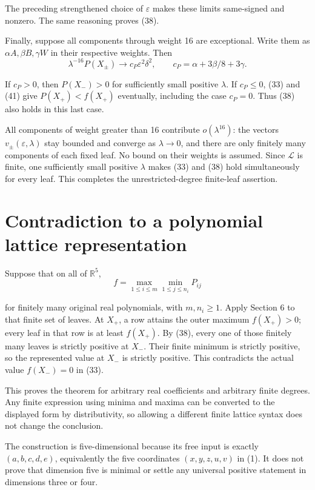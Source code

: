 \documentclass[11pt]{article}
\begin{document}
The preceding strengthened choice of \(\varepsilon\) makes these limits
same-signed and nonzero. The same reasoning proves (38).

Finally, suppose all components through weight 16 are exceptional. Write
them as \(\alpha A,\beta B,\gamma W\) in their respective weights.
Then
\[
\lambda^{-16}P(X_\pm)\longrightarrow
c_P\varepsilon^2\delta^2,
\qquad c_P=\alpha+3\beta/8+3\gamma.
\tag{41}
\]

If \(c_P>0\), then \(P(X_-)>0\) for sufficiently small positive
\(\lambda\). If \(c_P\le0\), (33) and (41) give
\(P(X_+)<f(X_+)\) eventually, including the case \(c_P=0\).
Thus (38) also holds in this last case.

All components of weight greater than 16 contribute
\(o(\lambda^{16})\): the vectors \(v_\pm(\varepsilon,\lambda)\)
stay bounded and converge as \(\lambda\to0\), and there are only
finitely many components of each fixed leaf. No bound on their weights is
assumed. Since \(\mathcal L\) is finite, one sufficiently small
positive \(\lambda\) makes (33) and (38) hold simultaneously for every
leaf. This completes the unrestricted-degree finite-leaf assertion.

\section{Contradiction to a polynomial lattice representation}

Suppose that on all of \(\mathbb R^5\),
\[
f=\max_{1\le i\le m}\min_{1\le j\le n_i}P_{ij}
\]

for finitely many original real polynomials, with \(m,n_i\ge1\).
Apply Section 6 to that finite set of leaves. At \(X_+\), a row attains
the outer maximum \(f(X_+)>0\); every leaf in that row is at least
\(f(X_+)\). By (38), every one of those finitely many leaves is
strictly positive at \(X_-\). Their finite minimum is strictly positive,
so the represented value at \(X_-\) is strictly positive. This contradicts
the actual value \(f(X_-)=0\) in (33).

This proves the theorem for arbitrary real coefficients and arbitrary finite
degrees. Any finite expression using minima and maxima can be converted to
the displayed form by distributivity, so allowing a different finite lattice
syntax does not change the conclusion.

The construction is five-dimensional because its free input is exactly
\((a,b,c,d,e)\), equivalently the five coordinates \((x,y,z,u,v)\) in
(1). It does not prove that dimension five is minimal or settle any universal
positive statement in dimensions three or four.
\end{document}
